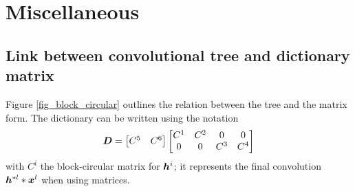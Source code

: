 \clearpage
{}
\appendix

\chapter{Miscellaneous}


\section{Link between convolutional tree and dictionary matrix}\label{sec_matrix_vs_tree} %

Figure \ref{fig_block_circular} outlines the relation between the tree and the matrix form. The dictionary can be written using the notation
$$\bm{D} = \begin{bmatrix}C^5 & C^6\end{bmatrix} \begin{bmatrix}C^1 & C^2 & 0 & 0 \\0 & 0 & C^3 & C^4\end{bmatrix}$$
with $C^i$ the block-circular matrix for $\bm{h}^i$; it represents the final convolution $\bm{h}^{*l}*\bm{x}^l$ when using matrices.

